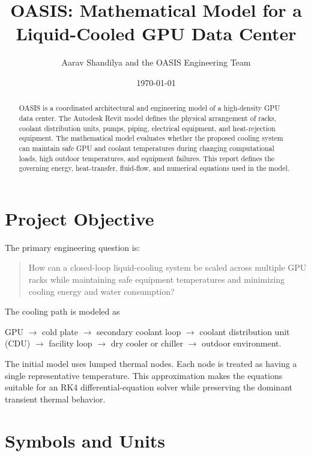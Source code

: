 \documentclass[11pt]{article}
\title{OASIS: Mathematical Model for a\\Liquid-Cooled GPU Data Center}
\author{Aarav Shandilya and the OASIS Engineering Team}
\date{\today}
\begin{document}
\maketitle

\begin{abstract}
OASIS is a coordinated architectural and engineering model of a high-density GPU
data center. The Autodesk Revit model defines the physical arrangement of racks,
coolant distribution units, pumps, piping, electrical equipment, and heat-rejection
equipment. The mathematical model evaluates whether the proposed cooling system can
maintain safe GPU and coolant temperatures during changing computational loads,
high outdoor temperatures, and equipment failures. This report defines the governing
energy, heat-transfer, fluid-flow, and numerical equations used in the model.
\end{abstract}

\tableofcontents
\newpage

\section{Project Objective}

The primary engineering question is:

\begin{quote}
How can a closed-loop liquid-cooling system be scaled across multiple GPU racks
while maintaining safe equipment temperatures and minimizing cooling energy and
water consumption?
\end{quote}

The cooling path is modeled as

\begin{center}
GPU $\rightarrow$ cold plate $\rightarrow$ secondary coolant loop
$\rightarrow$ coolant distribution unit (CDU) $\rightarrow$ facility loop
$\rightarrow$ dry cooler or chiller $\rightarrow$ outdoor environment.
\end{center}

The initial model uses lumped thermal nodes. Each node is treated as having a
single representative temperature. This approximation makes the equations suitable
for an RK4 differential-equation solver while preserving the dominant transient
thermal behavior.

\section{Symbols and Units}
\end{document}
